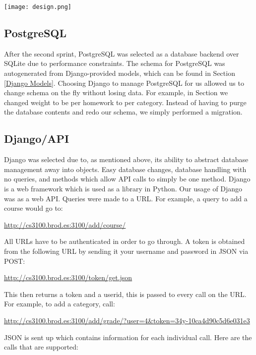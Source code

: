 \documentclass[a4paper]{article} %
\begin{document}
\centerline{\texttt{[image: design.png]}}

\subsection{PostgreSQL}

After the second sprint, PostgreSQL was selected as a database backend over SQLite due to performance constraints. The schema for PostgreSQL was autogenerated from Django-provided models, which can be found in Section \ref{Django Models}. Choosing Django to manage PostgreSQL for us allowed us to change schema on the fly without losing data. For example, in Section \label{First Sprint Third Scrum} we changed weight to be per homework to per category. Instead of having to purge the database contents and redo our schema, we simply performed a migration.

\subsection{Django/API}

Django was selected due to, as mentioned above, its ability to abstract database management away into objects. Easy database changes, database handling with no queries, and methods which allow API calls to simply be one method.  Django is a web framework which is used as a library in Python. Our usage of Django was as a web API.
Queries were made to a URL. For example, a query to add a course would go to:

\indent\url{http://cs3100.brod.es:3100/add/course/}

All URLs have to be authenticated in order to go through. A token is obtained from the following URL by sending it your username and password in JSON via POST:

\indent\url{http://cs3100.brod.es:3100/token/get.json}

This then returns a token and a userid, this is passed to every call on the URL. For example, to add a category, call:

\indent\url{http://cs3100.brod.es:3100/add/grade/?user=4&token=34y-10ca4d90c5d6e031e3}

JSON is sent up which contains information for each individual call. Here are the calls that are supported:
\end{document}
